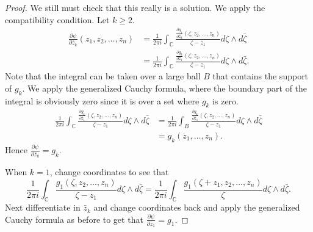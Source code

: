 \documentclass[12pt]{article}
\theoremstyle{theorem}
\theoremstyle{definition}
\theoremstyle{remark}
\begin{document}
\begin{proof}
We still must
check that this really is a solution.
We apply the compatibility condition.  Let $k \geq 2$.
\begin{equation*}
\begin{split}
\frac{\partial \psi}{\partial \bar{z}_k}(z_1,z_2,\ldots,z_n)
& =
\frac{1}{2\pi i}
\int_{\mathbb C}
\frac{
 \frac{\partial g_1}{\partial \bar{z}_k}(\zeta,z_2,\ldots,z_n)
}{\zeta - z_1}
d\zeta \wedge d\bar{\zeta}
\\
& =
\frac{1}{2\pi i}
\int_{\mathbb C}
\frac{
 \frac{\partial g_k}{\partial \bar{z}_1}(\zeta,z_2,\ldots,z_n)
}{\zeta - z_1}
d\zeta \wedge d\bar{\zeta} .
\end{split}
\end{equation*}
Note that the integral can be taken over a large ball $B$
that contains
the support of $g_k$.
We apply the generalized Cauchy formula, where the
boundary part of the integral is obviously zero since it is over
a set where $g_k$ is zero.
\begin{equation*}
\begin{split}
\frac{1}{2\pi i}
\int_{\mathbb C}
\frac{
 \frac{\partial g_k}{\partial \bar{z}_1}(\zeta,z_2,\ldots,z_n)
}{\zeta - z_1}
d\zeta \wedge d\bar{\zeta}
& =
\frac{1}{2\pi i}
\int_B
\frac{
 \frac{\partial g_k}{\partial \bar{z}_1}(\zeta,z_2,\ldots,z_n)
}{\zeta - z_1}
d\zeta \wedge d\bar{\zeta}
\\
& =
g_k(z_1,\ldots,z_n) .
\end{split}
\end{equation*}
Hence $\frac{\partial \psi}{\partial \bar{z}_k} = g_k$.

When $k=1$, change coordinates to see that
\begin{equation*}
\frac{1}{2\pi i}
\int_{\mathbb C}
\frac{
 g_1(\zeta,z_2,\ldots,z_n)
}{\zeta - z_1}
d\zeta \wedge d\bar{\zeta}
=
\frac{1}{2\pi i}
\int_{\mathbb C}
\frac{
 g_1(\zeta+z_1,z_2,\ldots,z_n)
}{\zeta}
d\zeta \wedge d\bar{\zeta} .
\end{equation*}
Next differentiate in $\bar{z}_k$ and change coordinates back and apply
the generalized Cauchy formula as before to get that
$\frac{\partial \psi}{\partial \bar{z}_1} = g_1 .$
\end{proof}
\end{document}
